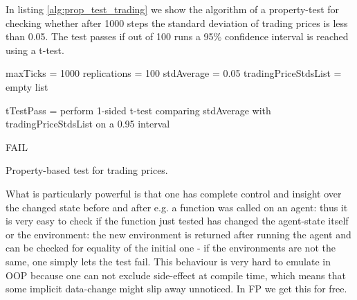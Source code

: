 In listing \ref{alg:prop_test_trading} we show the algorithm of a property-test for checking whether after 1000 steps the standard deviation of trading prices is less than 0.05. The test passes if out of 100 runs a 95\% confidence interval is reached using a t-test.

\begin{algorithm}
maxTicks = 1000\;
replications = 100\;
stdAverage = 0.05\;
tradingPriceStdsList = empty list\;


tTestPass = perform 1-sided t-test comparing stdAverage with tradingPriceStdsList on a 0.95 interval\;

 {
  FAIL\;
}
\caption{Property-based test for trading prices.}
\end{algorithm}
\label{alg:prop_test_trading}

What is particularly powerful is that one has complete control and insight over the changed state before and after e.g. a function was called on an agent: thus it is very easy to check if the function just tested has changed the agent-state itself or the environment: the new environment is returned after running the agent and can be checked for equality of the initial one - if the environments are not the same, one simply lets the test fail. This behaviour is very hard to emulate in OOP because one can not exclude side-effect at compile time, which means that some implicit data-change might slip away unnoticed. In FP we get this for free.

